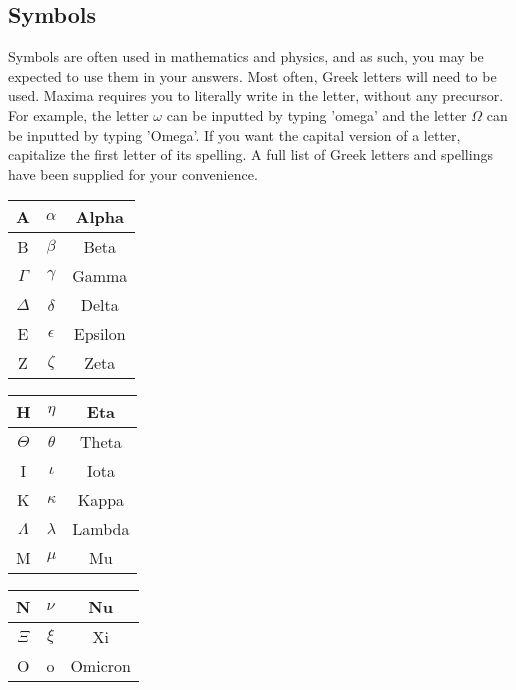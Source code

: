 \documentclass[a4paper]{article}
\begin{document}
\begin{multicols}{2}
\section*{Symbols}
Symbols are often used in mathematics and physics, and as such, you may be expected to use them in your answers. Most often, Greek letters will need to be used. Maxima requires you to literally write in the letter, without any precursor. For example, the letter $\omega$ can be inputted by typing 'omega' and the letter $\Omega$ can be inputted by typing 'Omega'. If you want the capital version of a letter, capitalize the first letter of its spelling. A full list of Greek letters and spellings have been supplied for your convenience.
\begin{table}[H]
\begin{minipage}{0.22\linewidth}
\centering
\begin{tabular}{|c|c|c|} \hline
A & $\alpha$ & Alpha\\ \hline
B & $\beta$ & Beta\\ \hline
$\Gamma$ & $\gamma$ & Gamma \\ \hline
$\Delta$ & $\delta$ & Delta \\ \hline
E & $\epsilon$ & Epsilon \\ \hline
Z & $\zeta$ & Zeta \\ \hline
\end{tabular}
\end{minipage}
\hspace{0.2cm}
\begin{minipage}{0.22\linewidth}
\centering
\begin{tabular}{|c|c|c|} \hline
H & $\eta$ & Eta \\ \hline
$\Theta$ & $\theta$ & Theta \\ \hline
I & $\iota$ & Iota \\ \hline
K & $\kappa$ & Kappa \\ \hline
$\Lambda$ & $\lambda$ & Lambda \\ \hline
M & $\mu$ & Mu \\ \hline
\end{tabular}
\end{minipage}
\hspace{0.2cm}
\begin{minipage}{0.22\linewidth}
\centering
\begin{tabular}{|c|c|c|} \hline
N & $\nu$ & Nu \\ \hline
$\Xi$ & $\xi$ & Xi \\ \hline
O & o & Omicron \\ \hline

\end{tabular}
\end{minipage}
\end{table}
\end{multicols}
\end{document}
